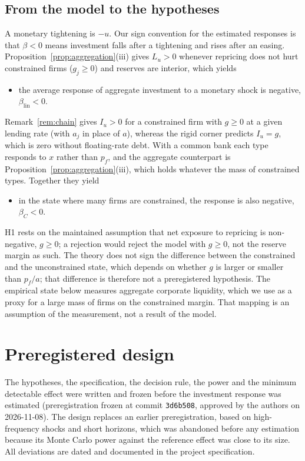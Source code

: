 \documentclass[11pt]{article}
\theoremstyle{remark}
\begin{document}
\subsection{From the model to the hypotheses}\label{sec:hypotheses}

A monetary tightening is $-u$. Our sign convention for the estimated responses is that $\beta<0$ means investment falls after a
tightening and rises after an easing. Proposition~\ref{prop:aggregation}(iii) gives $L_u>0$ whenever repricing does not hurt
constrained firms ($g_j\ge0$) and reserves are interior, which yields
\begin{itemize}
\item[\textbf{H0}] the average response of aggregate investment to a monetary shock is negative, $\beta_{\text{lin}}<0$.
\end{itemize}
Remark~\ref{rem:chain} gives $I_u>0$ for a constrained firm with $g\ge0$ at a given lending rate (with $a_j$ in place of $a$), whereas the rigid corner predicts
$I_u=g$, which is zero without floating-rate debt. With a common bank each type responds to $x$ rather than $p_f$, and the
aggregate counterpart is Proposition~\ref{prop:aggregation}(iii), which holds whatever the mass of constrained types. Together they
yield
\begin{itemize}
\item[\textbf{H1}] in the state where many firms are constrained, the response is also negative, $\beta_C<0$.
\end{itemize}
H1 rests on the maintained assumption that net exposure to repricing is non-negative, $g\ge0$; a rejection would reject the model
with $g\ge0$, not the reserve margin as such. The theory does not sign the difference between the constrained and the unconstrained
state, which depends on whether $g$ is larger or smaller than $p_f/a$; that difference is therefore not a preregistered hypothesis.
The empirical state below measures aggregate corporate liquidity, which we use as a proxy for a large mass of firms on the
constrained margin. That mapping is an assumption of the measurement, not a result of the model.

\section{Preregistered design}\label{sec:design}

The hypotheses, the specification, the decision rule, the power and the minimum detectable effect were written and frozen
before the investment response was estimated (preregistration frozen at commit \texttt{3d6b508}, approved by the authors on
2026-11-08). The design replaces an earlier preregistration, based on high-frequency shocks \citep{BauerSwanson2023} and
short horizons, which was abandoned before any estimation because its Monte Carlo power against the reference effect was close
to its size. All deviations are dated and documented in the project specification.
\end{document}
